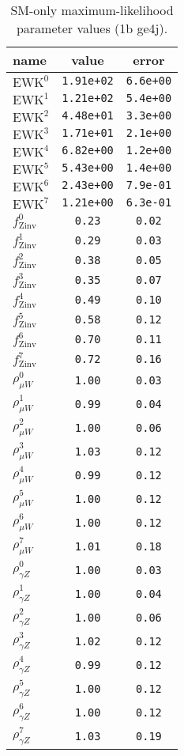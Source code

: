 \documentclass{article}
\begin{document}
\begin{table}\centering
\caption{SM-only maximum-likelihood parameter values (1b ge4j).}
\label{tab:mlParameterValues1b_ge4j}
\begin{tabular}{lcc}name & value & error \\ \hline
$\mathrm{EWK}^{0}$ & {\tt  1.91e+02} & {\tt  6.6e+00}\\
$\mathrm{EWK}^{1}$ & {\tt  1.21e+02} & {\tt  5.4e+00}\\
$\mathrm{EWK}^{2}$ & {\tt  4.48e+01} & {\tt  3.3e+00}\\
$\mathrm{EWK}^{3}$ & {\tt  1.71e+01} & {\tt  2.1e+00}\\
$\mathrm{EWK}^{4}$ & {\tt  6.82e+00} & {\tt  1.2e+00}\\
$\mathrm{EWK}^{5}$ & {\tt  5.43e+00} & {\tt  1.4e+00}\\
$\mathrm{EWK}^{6}$ & {\tt  2.43e+00} & {\tt  7.9e-01}\\
$\mathrm{EWK}^{7}$ & {\tt  1.21e+00} & {\tt  6.3e-01}\\
$f_\mathrm{Zinv}^{0}$ & {\tt 0.23} & {\tt 0.02}\\
$f_\mathrm{Zinv}^{1}$ & {\tt 0.29} & {\tt 0.03}\\
$f_\mathrm{Zinv}^{2}$ & {\tt 0.38} & {\tt 0.05}\\
$f_\mathrm{Zinv}^{3}$ & {\tt 0.35} & {\tt 0.07}\\
$f_\mathrm{Zinv}^{4}$ & {\tt 0.49} & {\tt 0.10}\\
$f_\mathrm{Zinv}^{5}$ & {\tt 0.58} & {\tt 0.12}\\
$f_\mathrm{Zinv}^{6}$ & {\tt 0.70} & {\tt 0.11}\\
$f_\mathrm{Zinv}^{7}$ & {\tt 0.72} & {\tt 0.16}\\
$\rho_{\mu W}^{0}$ & {\tt 1.00} & {\tt 0.03}\\
$\rho_{\mu W}^{1}$ & {\tt 0.99} & {\tt 0.04}\\
$\rho_{\mu W}^{2}$ & {\tt 1.00} & {\tt 0.06}\\
$\rho_{\mu W}^{3}$ & {\tt 1.03} & {\tt 0.12}\\
$\rho_{\mu W}^{4}$ & {\tt 0.99} & {\tt 0.12}\\
$\rho_{\mu W}^{5}$ & {\tt 1.00} & {\tt 0.12}\\
$\rho_{\mu W}^{6}$ & {\tt 1.00} & {\tt 0.12}\\
$\rho_{\mu W}^{7}$ & {\tt 1.01} & {\tt 0.18}\\
$\rho_{\gamma Z}^{0}$ & {\tt 1.00} & {\tt 0.03}\\
$\rho_{\gamma Z}^{1}$ & {\tt 1.00} & {\tt 0.04}\\
$\rho_{\gamma Z}^{2}$ & {\tt 1.00} & {\tt 0.06}\\
$\rho_{\gamma Z}^{3}$ & {\tt 1.02} & {\tt 0.12}\\
$\rho_{\gamma Z}^{4}$ & {\tt 0.99} & {\tt 0.12}\\
$\rho_{\gamma Z}^{5}$ & {\tt 1.00} & {\tt 0.12}\\
$\rho_{\gamma Z}^{6}$ & {\tt 1.00} & {\tt 0.12}\\
$\rho_{\gamma Z}^{7}$ & {\tt 1.03} & {\tt 0.19}\\
\hline
\end{tabular}
\end{table}
\end{document}
